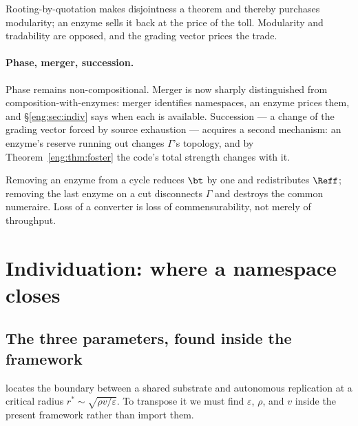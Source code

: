 \begin{corollary}\label{eng:markets-sell-back-modularity}
Rooting-by-quotation makes disjointness a theorem and thereby purchases
modularity; an enzyme sells it back at the price of the toll. Modularity
and tradability are opposed, and the grading vector prices the trade.
\end{corollary}

\paragraph{Phase, merger, succession.} Phase remains non-compositional.
Merger is now sharply distinguished from composition-with-enzymes: merger
identifies namespaces, an enzyme prices them, and \S\ref{eng:sec:indiv} says
when each is available. Succession --- a change of the grading vector
forced by source exhaustion --- acquires a second mechanism: an enzyme's
reserve running out changes $\Gamma$'s topology, and by
Theorem~\ref{eng:thm:foster} the code's total strength changes with it.

\begin{corollary}\label{eng:extinction-degrades-price-system}
Removing an enzyme from a cycle reduces $\bt$ by one and redistributes
$\Reff$; removing the last enzyme on a cut disconnects $\Gamma$ and
destroys the common numeraire. Loss of a converter is loss of
commensurability, not merely of throughput.
\end{corollary}

\section{Individuation: where a namespace closes}\label{eng:S8}
\label{eng:sec:indiv}

\subsection{The three parameters, found inside the framework}\label{eng:S8.1}

\cite{compaut} locates the boundary between a shared substrate and
autonomous replication at a critical radius $r^\ast \sim
\sqrt{\rho v/\varepsilon}$. To transpose it we must find $\varepsilon$,
$\rho$, and $v$ inside the present framework rather than import them.

